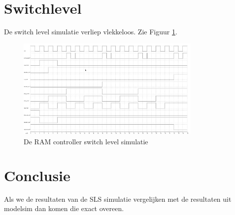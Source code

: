 \documentclass{scrreprt} %
\begin{document}
\section{Switchlevel}
De switch level simulatie verliep vlekkeloos. Zie Figuur \ref{fig:ramcontroller-sl-sim}.
\begin{figure}[H]
\centering
	\includegraphics[width=0.8\textwidth]{resources/wave_sls.png}
	\caption{De RAM controller switch level simulatie}
	\label{fig:ramcontroller-sl-sim}
\end{figure}

\section{Conclusie}
Als we de resultaten van de SLS simulatie vergelijken met de resultaten uit modelsim dan komen die exact overeen.
\end{document}
